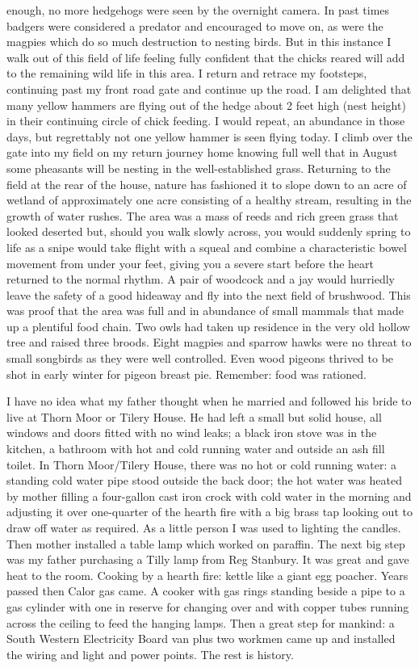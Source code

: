 enough, no more hedgehogs were seen by the overnight camera. In past times
badgers were considered a predator and encouraged to move on, as were the
magpies which do so much destruction to nesting birds. But in this instance I
walk out of this field of life feeling fully confident that the chicks reared
will add to the remaining wild life in this area. I return and retrace my
footsteps, continuing past my front road gate and continue up the road. I am
delighted that many yellow hammers are flying out of the hedge about 2 feet
high (nest height) in their continuing circle of chick feeding. I would repeat,
an abundance in those days, but regrettably not one yellow hammer is seen
flying today. I climb over the gate into my field on my return journey home
knowing full well that in August some pheasants will be nesting in the
well-established grass. Returning to the field at the rear of the house, nature
has fashioned it to slope down to an acre of wetland of approximately one acre
consisting of a healthy stream, resulting in the growth of water rushes. The
area was a mass of reeds and rich green grass that looked deserted but, should
you walk slowly across, you would suddenly spring to life as a snipe would take
flight with a squeal and combine a characteristic bowel movement from under
your feet, giving you a severe start before the heart returned to the normal
rhythm. A pair of woodcock and a jay would hurriedly leave the safety of a good
hideaway and fly into the next field of brushwood. This was proof that the area
was full and in abundance of small mammals that made up a plentiful food chain.
Two owls had taken up residence in the very old hollow tree and raised three
broods. Eight magpies and sparrow hawks were no threat to small songbirds as
they were well controlled. Even wood pigeons thrived to be shot in early winter
for pigeon breast pie. Remember: food was rationed.

I have no idea what my father thought when he married and followed his bride to
live at Thorn Moor or Tilery House. He had left a small but solid house, all
windows and doors fitted with no wind leaks; a black iron stove was in the
kitchen, a bathroom with hot and cold running water and outside an ash fill
toilet. In Thorn Moor/Tilery House, there was no hot or cold running water: a
standing cold water pipe stood outside the back door; the hot water was heated
by mother filling a four-gallon cast iron crock with cold water in the morning
and adjusting it over one-quarter of the hearth fire with a big brass tap
looking out to draw off water as required. As a little person I was used to
lighting the candles. Then mother installed a table lamp which worked on
paraffin. The next big step was my father purchasing a Tilly lamp from Reg
Stanbury. It was great and gave heat to the room. Cooking by a hearth fire:
kettle like a giant egg poacher. Years passed then Calor gas came. A cooker
with gas rings standing beside a pipe to a gas cylinder with one in reserve for
changing over and with copper tubes running across the ceiling to feed the
hanging lamps. Then a great step for mankind: a South Western Electricity Board
van plus two workmen came up and installed the wiring and light and power
points. The rest is history.
